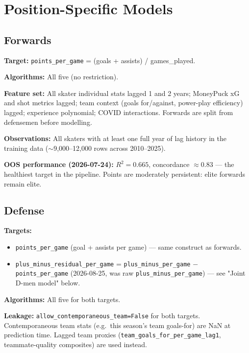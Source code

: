 \documentclass[11pt, a4paper]{article}
\begin{document}
\section{Position-Specific Models}
\label{sec:positions}

\subsection{Forwards}
\label{sec:forwards}

\textbf{Target:} \texttt{points\_per\_game} = (goals + assists) / games\_played.

\textbf{Algorithms:} All five (no restriction).

\textbf{Feature set:} All skater individual stats lagged 1 and 2 years; MoneyPuck xG and shot
metrics lagged; team context (goals for/against, power-play efficiency) lagged; experience
polynomial; COVID interactions. Forwards are split from defensemen before modelling.

\textbf{Observations:} All skaters with at least one full year of lag history in the training
data ($\sim$9{,}000--12{,}000 rows across 2010--2025).

\textbf{OOS performance (2026-07-24):} $R^2 = 0.665$, concordance $\approx 0.83$ — the healthiest
target in the pipeline. Points are moderately persistent: elite forwards remain elite.

\subsection{Defense}
\label{sec:defense}

\textbf{Targets:}
\begin{itemize}[leftmargin=*]
  \item \texttt{points\_per\_game} (goal + assists per game) — same construct as forwards.
  \item \texttt{plus\_minus\_residual\_per\_game} = \texttt{plus\_minus\_per\_game} $-$
        \texttt{points\_per\_game} (2026-08-25, was raw \texttt{plus\_minus\_per\_game}) — see
        "Joint D-men model" below.
\end{itemize}

\textbf{Algorithms:} All five for both targets.

\textbf{Leakage:} \texttt{allow\_contemporaneous\_team=False} for both targets.
Contemporaneous team stats (e.g.\ this season's team goals-for) are NaN at prediction time.
Lagged team proxies (\texttt{team\_goals\_for\_per\_game\_lag1}, teammate-quality composites) are
used instead.
\end{document}
